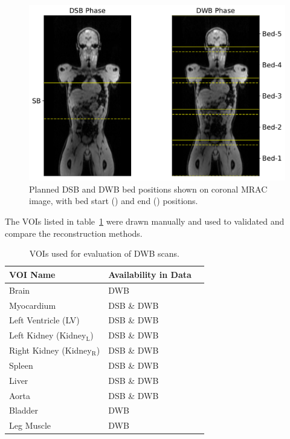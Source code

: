 \begin{figure} [ht!]
\centering
\includegraphics[scale=0.42,angle=0]{3_Results/3_3_DWB_Reconstruction/figures/3_3_IsotoPK_CTRL_PositionsOnMR.pdf}
\caption{Planned DSB and DWB bed positions shown on coronal MRAC image, with bed start (\protect{}) and end (\protect{}) positions.} 
\label{fig_3_3:IsotoPK_BedPositionsOnMR}
\end{figure} 

The VOIs listed in table~\ref{tab:IsotoPK_VOIs} were drawn manually and used to validated and compare the reconstruction methods.

\begin{table}[ht!]
\centering
\caption{\label{tab:IsotoPK_VOIs} VOIs used for evaluation of DWB scans.}
\begin{tabular}{lll}
\toprule
\textbf{VOI Name} & \textbf{Availability in Data}  \\
\midrule
Brain        & DWB                 \\
Myocardium & DSB \& DWB              \\
Left Ventricle (LV) & DSB \& DWB     \\
Left Kidney (Kidney$_\mathrm{L}$) & DSB \& DWB  \\
Right Kidney (Kidney$_\mathrm{R}$) & DSB \& DWB \\
Spleen & DSB \& DWB \\
Liver  & DSB \& DWB \\
Aorta & DSB \& DWB \\
Bladder & DWB \\
Leg Muscle & DWB \\
\toprule
\end{tabular}
\end{table}

